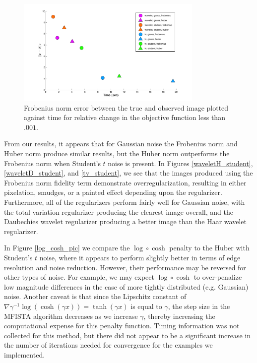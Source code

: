 \documentclass[10pt,a4paper]{article}
\begin{document}
	\begin{figure}[t]
		
		\begin{center}
			\includegraphics[width=0.8\textwidth]{../figures/comparePlot2.pdf}
			\caption{ Frobenius norm error between the true and observed image plotted against time for relative change in the objective function less than $.001$. }
			\label{comp_methods}
		\end{center}
	\end{figure}
	
	From our results, it appears that for Gaussian noise the Frobenius norm and Huber norm produce similar results, but the Huber norm outperforms the Frobenius norm when Student's $t$ noise is present. In Figures \ref{waveletH_student}, \ref{waveletD_student}, and \ref{tv_student}, we see that the images produced using the Frobenius norm fidelity term demonstrate overregularization, resulting in either pixelation, smudges, or a painted effect depending upon the regularizer. Furthermore, all of the regularizers perform fairly well for Gaussian noise, with the total variation regularizer producing the clearest image overall, and the Daubechies wavelet regularizer producing a better image than the Haar wavelet regularizer. 
	
	In Figure \ref{log_cosh_pic} we compare the $\log \circ \cosh$ penalty to the Huber with Student's $t$ noise, where it appears to perform slightly better in terms of edge resolution and noise reduction. However, their performance may be reversed for other types of noise. For example, we may expect $\log \circ \cosh$ to over-penalize low magnitude differences in the case of more tightly distributed (e.g. Gaussian) noise. Another caveat is that since the Lipschitz constant of $\nabla \gamma^{-1} \log ( \cosh ( \gamma x )) = \tanh (\gamma x)$ is equal to $\gamma$, the step size in the MFISTA algorithm decreases as we increase $\gamma$, thereby increasing the computational expense for this penalty function. Timing information was not collected for this method, but there did not appear to be a significant increase in the number of iterations needed for convergence for the examples we implemented.
  
\end{document}
